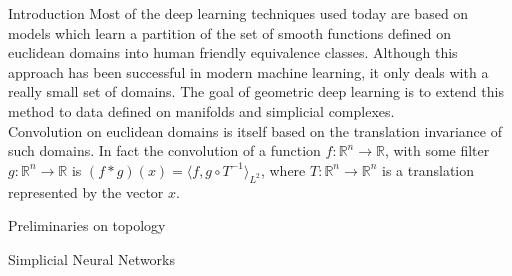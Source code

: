 \documentclass[12pt,a4paper]{report}
\theoremstyle{plain}
\theoremstyle{definition}
\theoremstyle{remark}
\newcommand{\bb}[1]{\textbf{#1}}
\newcommand{\R}{\mathbb{R}}
\newcommand{\scal}[2]{\langle #1, #2 \rangle}
\begin{document}
    \begin{titlepage}
        
    \end{titlepage}
    \begin{section}{Introduction}
        Most of the deep learning techniques used today are based on models which learn a partition of the set of smooth functions defined on euclidean 
        domains into human friendly equivalence classes. Although this approach has been successful in modern machine learning, it only deals with a really 
        small set of domains. The goal of geometric deep learning is to extend this method to data defined on manifolds and simplicial complexes.\\
        Convolution on euclidean domains is itself based on the translation invariance of such domains. In fact the convolution of a function $f : \R^n \to \R$,
        with some filter $g:\R^n \to \R$ is $(f * g)(x) = \scal{f}{g \circ T^{-1}}_{L^2}$, where $T:\R^n \to \R^n$ is a translation represented by the vector $x$.
    \end{section}
    \tableofcontents
    \newpage
    \begin{chapter}{Preliminaries on topology}
        
    \end{chapter}
    \begin{chapter}{Simplicial Neural Networks}
        
    \end{chapter}
    \newpage
    \printbibliography[heading = bibintoc]
\end{document}
